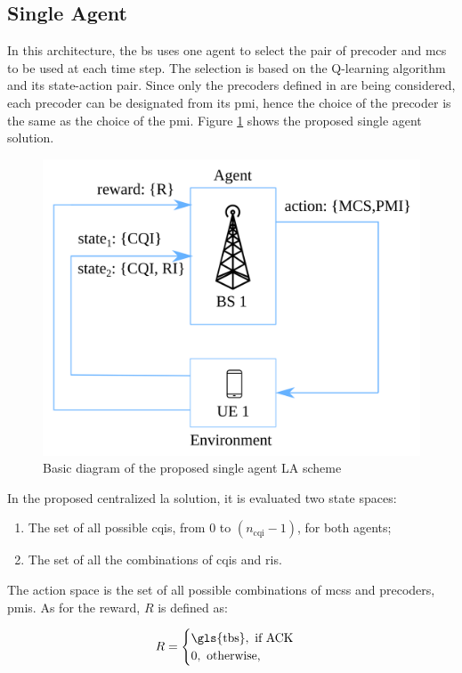 \subsection{Single Agent}
\label{subsec:single-agent}

In this architecture, the \gls{bs} uses one agent to select the pair of precoder and \gls{mcs} to be used at each time step.
%
The selection is based on the Q-learning algorithm and its state-action pair.
%
Since only the precoders defined in \cite{3gpp.38.214} are being considered, each precoder can be designated from its \gls{pmi}, hence the choice of the precoder is the same as the choice of the \gls{pmi}.
%
Figure \ref{fig:la-rl-frame-sa} shows the proposed single agent solution.


\begin{figure}[!hb]
	\centerline{\includegraphics[width=0.7\columnwidth]{figures/chp_la/rl-framework-mateus_sa.png}}
	\caption{Basic diagram of the proposed single agent LA scheme}
	\label{fig:la-rl-frame-sa}
\end{figure}

In the proposed centralized \gls{la} solution, it is evaluated two state spaces:
\begin{enumerate}
    \item The set of all possible \gls{cqi}s, from $0$ to $(n_{\text{cqi}}-1)$, for both agents;
    \item The set of all the combinations of \glspl{cqi} and \glspl{ri}.
\end{enumerate}
%
The action space is the set of all possible combinations of \glspl{mcs} and precoders, \glspl{pmi}.
%
As for the reward, $R$ is defined as:

\begin{equation}\label{eq.:la-reward-sa}
    R = \begin{cases}
    \textrm{\gls{tbs}}, \text{ if ACK} \\
    0, \text{ otherwise,}
    \end{cases}
\end{equation}

